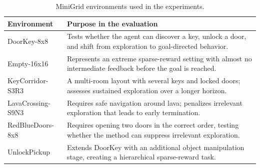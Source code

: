 \begin{table}[H]
\centering
\caption{MiniGrid environments used in the experiments.}
\label{tab:envs}
\begin{tabular}{|m{4cm}|m{9cm}|}
\hline
\textbf{Environment} & \textbf{Purpose in the evaluation} \\ \hline
DoorKey-8x8 & Tests whether the agent can discover a key, unlock a door, and shift from exploration to goal-directed behavior. \\ \hline
Empty-16x16 & Represents an extreme sparse-reward setting with almost no intermediate feedback before the goal is reached. \\ \hline
KeyCorridor-S3R3 & A multi-room layout with several keys and locked doors; assesses sustained exploration over a longer horizon. \\ \hline
LavaCrossing-S9N3 & Requires safe navigation around lava; penalizes irrelevant exploration that leads to early termination. \\ \hline
RedBlueDoors-8x8 & Requires opening two doors in the correct order, testing whether the method can suppress irrelevant exploration. \\ \hline
UnlockPickup & Extends DoorKey with an additional object manipulation stage, creating a hierarchical sparse-reward task. \\ \hline
\end{tabular}
\end{table}

